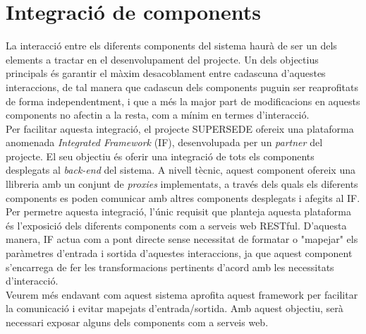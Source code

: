 \section{Integració de components}

La interacció entre els diferents components del sistema haurà de ser un dels elements a tractar en el desenvolupament del projecte. Un dels objectius principals és garantir el màxim desacoblament entre cadascuna d'aquestes interaccions, de tal manera que cadascun dels components puguin ser reaprofitats de forma independentment, i que a més la major part de modificacions en aquests components no afectin a la resta, com a mínim en termes d'interacció.\\

Per facilitar aquesta integració, el projecte SUPERSEDE ofereix una plataforma anomenada \textit{Integrated Framework} (IF), desenvolupada per un \textit{partner} del projecte. El seu objectiu és oferir una integració de tots els components desplegats al \textit{back-end} del sistema. A nivell tècnic, aquest component ofereix una llibreria amb un conjunt de \textit{proxies} implementats, a través dels quals els diferents components es poden comunicar amb altres components desplegats i afegits al IF.\\

Per permetre aquesta integració, l'únic requisit que planteja aquesta plataforma és l'exposició dels diferents components com a serveis web RESTful. D'aquesta manera, IF actua com a pont directe sense necessitat de formatar o "mapejar" els paràmetres d'entrada i sortida d'aquestes interaccions, ja que aquest component s'encarrega de fer les transformacions pertinents d'acord amb les necessitats d'interacció. \\

Veurem més endavant com aquest sistema aprofita aquest framework per facilitar la comunicació i evitar mapejats d'entrada/sortida. Amb aquest objectiu, serà necessari exposar alguns dels components com a serveis web.